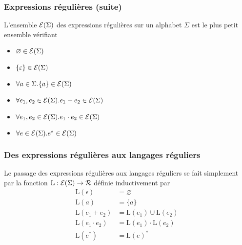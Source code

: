 %
\begin{frame}
\frametitle{Expressions régulières (suite)}

L'ensemble ${\cal E} (\Sigma)$ des expressions régulières sur un
alphabet $\Sigma$ est le plus petit ensemble vérifiant

\begin{itemize}

  \item $\varnothing \in {\cal E} (\Sigma)$

  \item $\{\varepsilon\} \in {\cal E} (\Sigma)$

  \item $\forall a \in \Sigma.\{a\} \in {\cal E} (\Sigma)$

  \item $\forall e_1, e_2 \in {\cal E} (\Sigma).e_1 + e_2
  \in {\cal E} (\Sigma)$

  \item $\forall e_1, e_2 \in {\cal E} (\Sigma).e_1 \cdot e_2
  \in {\cal E} (\Sigma)$

  \item $\forall e \in {\cal E} (\Sigma).e^{*} \in {\cal E}
  (\Sigma)$

\end{itemize}

\end{frame}

%
\begin{frame}
\frametitle{Des expressions régulières aux langages réguliers}

Le passage des expressions régulières aux langages réguliers se fait
simplement par la fonction $\mathrm{L} : {\cal E} (\Sigma) \rightarrow
{\cal R}$ définie inductivement par
\begin{align*}
\mathrm{L} (\epsilon) & = \varnothing\\
\mathrm{L} (a) & = \{a\}\\
\mathrm{L} (e_1 + e_2) & = \mathrm{L} (e_1) \cup \mathrm{L} (e_2)\\
\mathrm{L} (e_1 \cdot e_2) & = \mathrm{L} (e_1) \cdot \mathrm{L} (e_2)\\
\mathrm{L} (e^{*}) & = \mathrm{L} (e)^{*}
\end{align*}

\end{frame}

